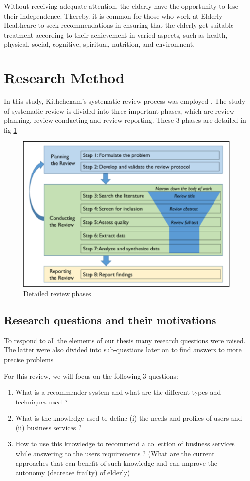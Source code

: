 \documentclass[preprint,3p,times,number]{elsarticle}
\begin{document}
Without receiving adequate attention, the elderly have the opportunity to lose their independence. Thereby, it is common for those who work at Elderly Healthcare to seek recommendations in ensuring that the elderly get suitable treatment according to their achievement in varied aspects, such as health, physical, social, cognitive, spiritual, nutrition, and environment.



\section{Research Method}
In this study, Kithchenam’s systematic review process was employed \cite{kitchenham2004procedures}. The study of systematic review is divided into three important phases, which are review planning, review conducting and review reporting.
These 3 phases are detailed in fig \ref{fig:Review Phases}

\begin{figure}[t]
 \begin{center}
    \includegraphics[width=0.5\linewidth]{figures/Review Phases.png}
    \caption{Detailed review phases}
    \label{fig:Review Phases}
 \end{center}
\end{figure}


\subsection{Research questions and their motivations}

To respond to all the elements of our thesis many research questions were raised. The latter were also divided into sub-questions later on to find answers to more precise problems.

For this review, we will focus on the following 3 questions: 
\begin{enumerate}
    \item What is a recommender system and what are the different types and techniques used ?
    \item What is the knowledge used to define (i) the needs and profiles of users and (ii) business services ?
    \item How to use this knowledge to recommend a collection of business services while answering to the users requirements ?  (What are the current approaches that can benefit of such knowledge and can improve the autonomy (decrease frailty) of elderly)
\end{enumerate}
\end{document}
